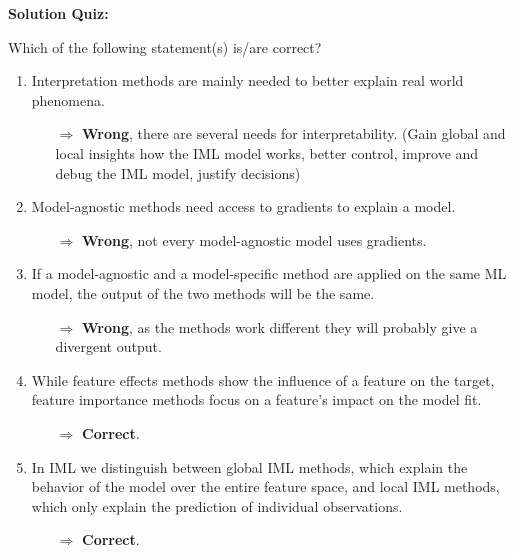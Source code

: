 \textbf{Solution Quiz:}\\\noindent
\medskip

Which of the following statement(s) is/are correct?  
	\begin{enumerate}
        \item Interpretation methods are mainly needed to better explain real world phenomena. 
        \begin{itemize}
        	\item[$\Rightarrow$] \textbf{Wrong}, there are several needs for interpretability. (Gain global and local insights how the IML model works, better control, improve and debug the IML model, justify decisions)
        \end{itemize}
        \item Model-agnostic methods need access to gradients to explain a model. 
        \begin{itemize}
        	\item[$\Rightarrow$] \textbf{Wrong}, not every model-agnostic model uses gradients.
        \end{itemize}
    	\item If a model-agnostic and a model-specific method are applied on the same ML model, the output of the two methods will be the same.
    	\begin{itemize}
    		\item[$\Rightarrow$] \textbf{Wrong}, as the methods work different they will probably give a divergent output.
    	\end{itemize}
    	\item While feature effects methods show the influence of a feature on the target, feature importance methods focus on a feature's impact on the model fit.
    	\begin{itemize}
    		\item[$\Rightarrow$] \textbf{Correct}.
    	\end{itemize}
    	\item In IML we distinguish between global IML methods, which explain the behavior of the model over the entire feature space, and local IML methods, which only explain the prediction of individual observations. 
    	\begin{itemize}
    		\item[$\Rightarrow$] \textbf{Correct}.
    	\end{itemize}

\end{enumerate}
